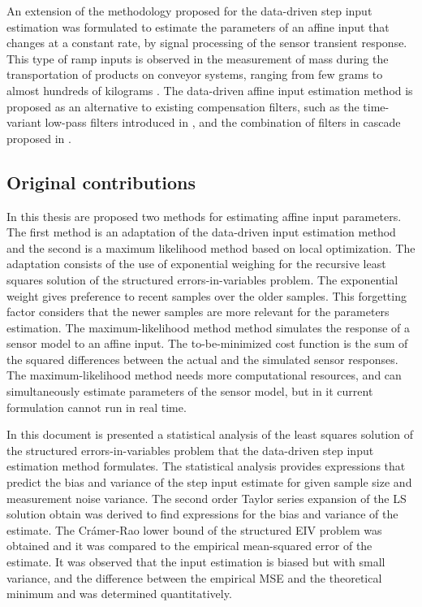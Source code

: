%
An extension of the methodology proposed for the data-driven step input estimation was formulated to estimate the parameters of an affine input that changes at a constant rate,  by signal processing of the sensor transient response.
This type of ramp inputs is observed in the measurement of mass during the transportation of products on conveyor systems, ranging from few grams \cite{Burmen09} to almost hundreds of kilograms \cite{Tasaki07}.
The data-driven affine input estimation method is proposed as an alternative to existing compensation filters, such as 
the time-variant low-pass filters introduced in \cite{Piskorowski08, Pietrzak14}, and
the combination of filters in cascade proposed in \cite{Niedzwiecki16a}.

\subsection{Original contributions}
In this thesis are proposed two methods for estimating affine input parameters.
The first method is an adaptation of the data-driven input estimation method and the second is a maximum likelihood method based on local optimization.
The adaptation consists of the use of exponential weighing for the recursive least squares solution of the structured errors-in-variables problem.
The exponential weight gives preference to recent samples over the older samples.
This forgetting factor considers that the newer samples are more relevant for the parameters estimation.
The maximum-likelihood method method simulates the response of a sensor model to an affine input. 
The to-be-minimized cost function is the sum of the squared differences between the actual and the simulated sensor responses. 
The maximum-likelihood method needs more computational resources, and can simultaneously estimate parameters of the sensor model, but in it current formulation cannot run in real time.

In this document is presented a statistical analysis of the least squares solution of the structured errors-in-variables problem that the data-driven step input estimation method formulates.
The statistical analysis provides expressions that predict the bias and variance of the step input estimate for given sample size and measurement noise variance.
The second order Taylor series expansion of the LS solution obtain was derived to find expressions for the bias and variance of the estimate.
The Crámer-Rao lower bound of the structured EIV problem was obtained and it was compared to the empirical mean-squared error of the estimate.
It was observed that the input estimation is biased but with small variance, and the difference between the empirical MSE and the theoretical minimum and was determined quantitatively.


